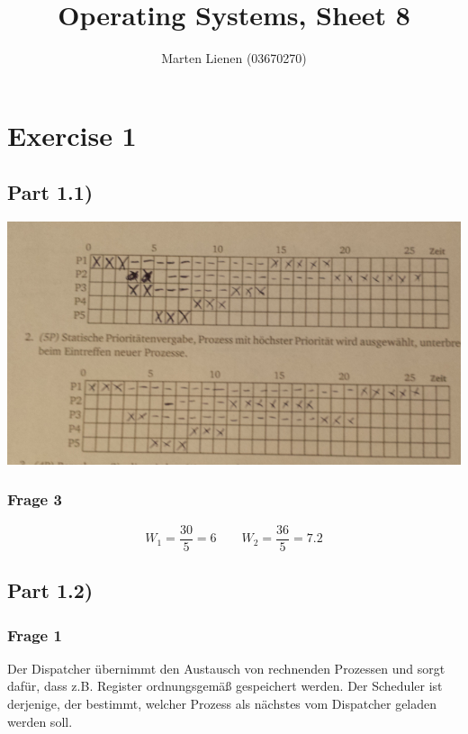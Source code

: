 \documentclass[10pt,a4paper]{article}
\title{Operating Systems, Sheet 8}
\author{Marten Lienen (03670270)}
\begin{document}
\maketitle

\section*{Exercise 1}

\subsection*{Part 1.1)}

\includegraphics[width=\textwidth]{sheet-8/exercise-1-1}

\subsubsection*{Frage 3}

\begin{equation*}
  W_{1} = \frac{30}{5} = 6 \qquad W_{2} = \frac{36}{5} = 7.2
\end{equation*}

\subsection*{Part 1.2)}

\subsubsection*{Frage 1}

Der Dispatcher übernimmt den Austausch von rechnenden Prozessen und sorgt dafür, dass z.B. Register ordnungsgemäß gespeichert werden.
Der Scheduler ist derjenige, der bestimmt, welcher Prozess als nächstes vom Dispatcher geladen werden soll.
\end{document}
